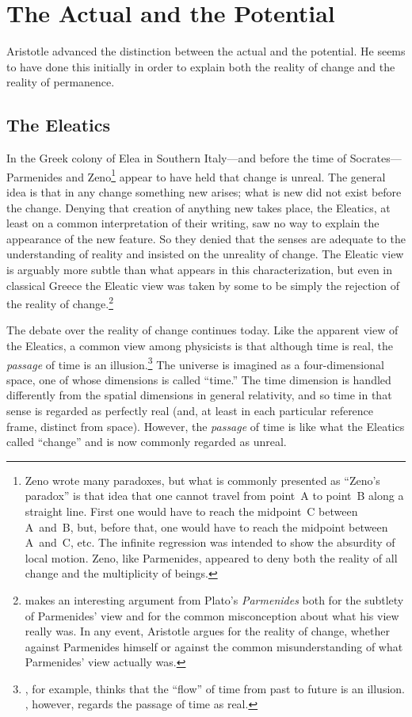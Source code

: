 \documentclass[twocolumn]{article}
\begin{document}
\section{The Actual and the Potential}

Aristotle advanced the distinction between the actual and the potential.  He
seems to have done this initially in order to explain both the reality of
change and the reality of permanence.

\subsection{The Eleatics}

In the Greek colony of Elea in Southern Italy---and before the time of
Socrates---Parmenides and Zeno\footnote{%
   Zeno wrote many paradoxes, but what is commonly presented as ``Zeno's
   paradox'' is that idea that one cannot travel from point~A to point~B along
   a straight line.  First one would have to reach the midpoint~C between
   A~and~B, but, before that, one would have to reach the midpoint between
   A~and~C, etc.  The infinite regression was intended to show the absurdity of
   local motion.  Zeno, like Parmenides, appeared to deny both the reality of
   all change and the multiplicity of beings.%
}
appear to have held that change is unreal.  The general idea is that in any
change something new arises; what is new did not exist before the change.
Denying that creation of anything new takes place, the Eleatics, at least on a
common interpretation of their writing, saw no way to explain the appearance of
the new feature.  So they denied that the senses are adequate to the
understanding of reality and insisted on the unreality of change.  The Eleatic
view is arguably more subtle than what appears in this characterization, but
even in classical Greece the Eleatic view was taken by some to be simply the
rejection of the reality of change.\footnote{%
   \cite{p2017} makes an interesting argument from Plato's {\it Parmenides}
   both for the subtlety of Parmenides' view and for the common misconception
   about what his view really was.  In any event, Aristotle argues for the
   reality of change, whether against Parmenides himself or against the common
   misunderstanding of what Parmenides' view actually was.%
}

The debate over the reality of change continues today.  Like the apparent view
of the Eleatics, a common view among physicists is that although time is real,
the \emph{passage} of time is an illusion.\footnote{%
   \cite{c2015}, for example, thinks that the ``flow'' of time from past to
   future is an illusion. \cite{s2013}, however, regards the passage of time as
   real.%
}
The universe is imagined as a four-dimensional space, one of whose dimensions
is called ``time.''  The time dimension is handled differently from the spatial
dimensions in general relativity, and so time in that sense is regarded as
perfectly real (and, at least in each particular reference frame, distinct from
space).  However, the \emph{passage} of time is like what the Eleatics called
``change'' and is now commonly regarded as unreal.
\end{document}
